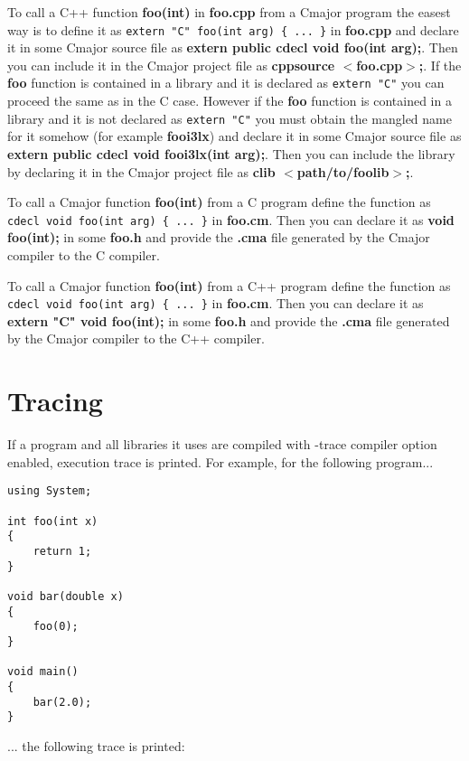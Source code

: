 \documentclass[oneside, a4paper, 11pt]{article}
\begin{document}
To call a C++ function \textbf{foo(int)} in \textbf{foo.cpp} from a Cmajor program the easest way is to define it
as \verb|extern "C" foo(int arg) { ... }| in \textbf{foo.cpp} and declare it in some Cmajor source file as
\textbf{extern public cdecl void foo(int arg);}. Then you can include it in the Cmajor project file as
\textbf{cppsource $<$foo.cpp$>$;}.
If the \textbf{foo} function is contained in a library and it is declared as \verb|extern "C"| you can proceed the same as in the C case.
However if the \textbf{foo} function is contained in a library and it is not declared as \verb|extern "C"| you
must obtain the mangled name for it somehow (for example \textbf{fooi3lx}) and declare it in some Cmajor source file as
\textbf{extern public cdecl void fooi3lx(int arg);}.
Then you can include the library by declaring it in the Cmajor project file as \textbf{clib $<$path/to/foolib$>$;}.

To call a Cmajor function \textbf{foo(int)} from a C program define the function as\\
\verb|cdecl void foo(int arg) { ... }| in \textbf{foo.cm}. Then you can declare it as
\textbf{void foo(int);} in some \textbf{foo.h} and
provide the \textbf{.cma} file generated by the Cmajor compiler to the C compiler.

To call a Cmajor function \textbf{foo(int)} from a C++ program define the function as\\
\verb|cdecl void foo(int arg) { ... }| in \textbf{foo.cm}. Then you can declare it as
\textbf{extern "C" void foo(int);} in some \textbf{foo.h} and
provide the \textbf{.cma} file generated by the Cmajor compiler to the C++ compiler.

\section{Tracing}

If a program and all libraries it uses are compiled with -trace compiler option enabled,
execution trace is printed. For example, for the following program...

\begin{verbatim}
using System;

int foo(int x)
{
    return 1;
}

void bar(double x)
{
    foo(0);
}

void main()
{
    bar(2.0);
}
\end{verbatim}

... the following trace is printed:
\end{document}
